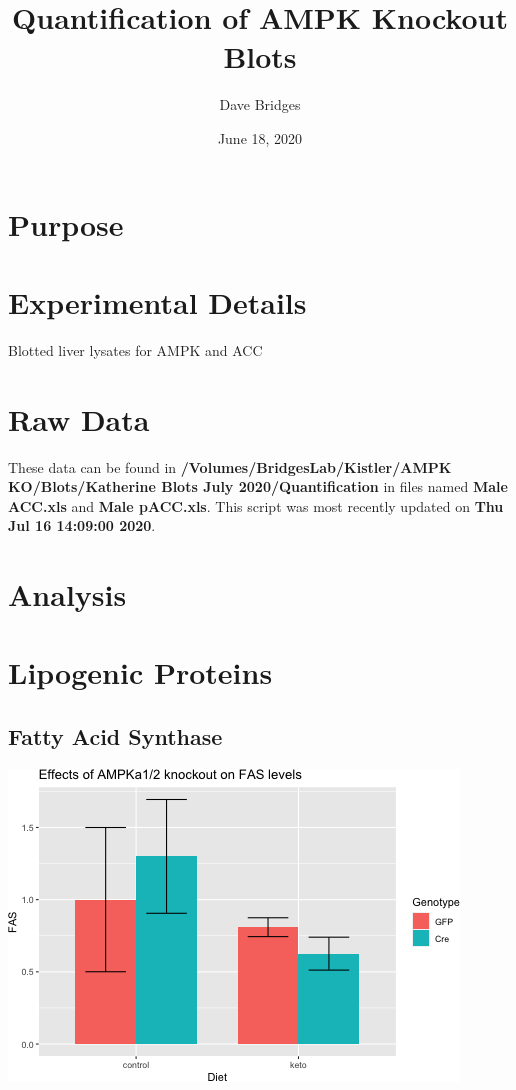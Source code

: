 \documentclass[]{article}
\title{Quantification of AMPK Knockout Blots}
\author{Dave Bridges}
\date{June 18, 2020}
\begin{document}
\maketitle

{
\setcounter{tocdepth}{2}
\tableofcontents
}
\hypertarget{purpose}{%
\section{Purpose}\label{purpose}}

\hypertarget{experimental-details}{%
\section{Experimental Details}\label{experimental-details}}

Blotted liver lysates for AMPK and ACC

\hypertarget{raw-data}{%
\section{Raw Data}\label{raw-data}}

These data can be found in \textbf{/Volumes/BridgesLab/Kistler/AMPK
KO/Blots/Katherine Blots July 2020/Quantification} in files named
\textbf{Male ACC.xls} and \textbf{Male pACC.xls}. This script was most
recently updated on \textbf{Thu Jul 16 14:09:00 2020}.

\hypertarget{analysis}{%
\section{Analysis}\label{analysis}}

\hypertarget{lipogenic-proteins}{%
\section{Lipogenic Proteins}\label{lipogenic-proteins}}

\hypertarget{fatty-acid-synthase}{%
\subsection{Fatty Acid Synthase}\label{fatty-acid-synthase}}

\includegraphics{figures/fas-barplot-1.png}
\end{document}
